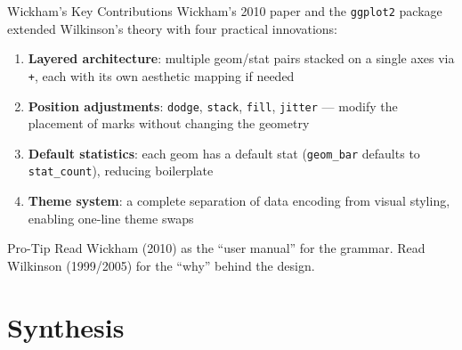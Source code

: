 \documentclass[10pt]{beamer}
\begin{document}
\begin{frame}{Wickham's Key Contributions}
  Wickham's 2010 paper and the \texttt{ggplot2} package extended
  Wilkinson's theory with four practical innovations:

  \begin{enumerate}
    \item \textbf{Layered architecture}: multiple geom/stat pairs stacked
          on a single axes via \texttt{+}, each with its own aesthetic
          mapping if needed
    \item \textbf{Position adjustments}: \texttt{dodge}, \texttt{stack},
          \texttt{fill}, \texttt{jitter} --- modify the placement of
          marks without changing the geometry
    \item \textbf{Default statistics}: each geom has a default stat
          (\texttt{geom\_bar} defaults to \texttt{stat\_count}), reducing
          boilerplate
    \item \textbf{Theme system}: a complete separation of data encoding
          from visual styling, enabling one-line theme swaps
  \end{enumerate}

  \begin{alertblock}{Pro-Tip}
    Read Wickham (2010) as the ``user manual'' for the grammar. Read
    Wilkinson (1999/2005) for the ``why'' behind the design.
  \end{alertblock}
\end{frame}

\section{Synthesis}
\end{document}
